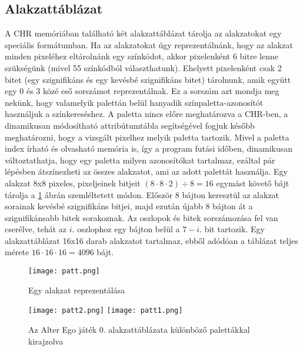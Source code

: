 \subsection{Alakzattáblázat \cite{ppuref}}

A CHR memóriában található két alakzattáblázat tárolja  az alakzatokat egy speciális formátumban. Ha az alakzatokat úgy reprezentálnánk, hogy az alakzat minden pixeléhez eltárolnánk egy színkódot, akkor pixelenként 6 bitre lenne szükségünk (mivel 55 színkódból választhatunk). Ehelyett pixelenként csak 2 bitet (egy szignifikáns és egy kevésbé szignifikáns bitet) tárolnunk, amik együtt egy 0 és 3 közé eső sorszámot reprezentálnak. Ez a sorszám azt mondja meg nekünk, hogy valamelyik palettán belül hanyadik színpaletta-azonosítót használjuk a színkereséshez. A paletta nincs előre meghatározva a CHR-ben, a dinamikusan módosítható attribútumtábla segítségével fogjuk később meghatározni, hogy a vizsgált pixelhez melyik paletta tartozik. Mivel a paletta index írható és olvasható memória is, így a program futási időben, dinamikusan változtathatja, hogy egy paletta milyen azonosítókat tartalmaz, ezáltal pár lépésben átszínezheti az összes alakzatot, ami az adott palettát használja.
Egy alakzat 8x8 pixeles, pixeljeinek bitjeit $(8\cdot8\cdot2)\div8 = 16$ egymást követő bájt tárolja a \ref{fig:patt} ábrán szemléltetett módon.
Először 8 bájton keresztül az alakzat sorainak kevésbé szignifikáns bitjei, majd ezután újabb 8 bájton át a szignifikánsabb bitek sorakoznak. Az oszlopok és bitek sorszámozása fel van cserélve, tehát az $i.$ oszlophoz egy bájton belül a $7-i.$ bit tartozik.  
Egy alakzattáblázat 16x16 darab alakzatot tartalmaz, ebből adódóan a táblázat teljes mérete $16\cdot16\cdot16 = 4096$ bájt.

\begin{figure}[H]
	\centering
	\texttt{[image: patt.png]}
	\caption{Egy alakzat reprezentálása}
	\label{fig:patt}
\end{figure}


\begin{figure}[H]
	\centering
	\texttt{[image: patt2.png]}
	\hspace{5pt}
	\texttt{[image: patt1.png]}
	\caption{Az Alter Ego játék 0. alakzattáblázata különböző palettákkal kirajzolva}
\end{figure}


